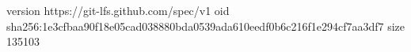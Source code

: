 version https://git-lfs.github.com/spec/v1
oid sha256:1e3cfbaa90f18e05cad038880bda0539ada610eedf0b6c216f1e294cf7aa3df7
size 135103
